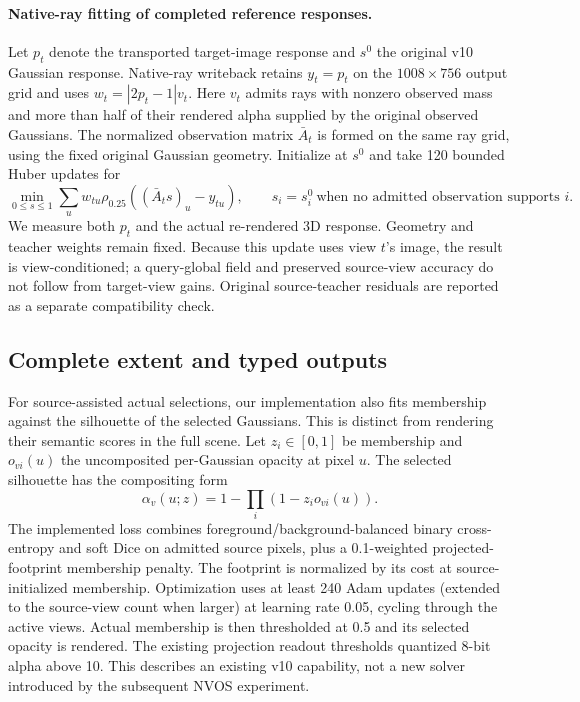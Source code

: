 \paragraph{Native-ray fitting of completed reference responses.}
Let $p_t$ denote the transported target-image response and $s^0$ the original
v10 Gaussian response. Native-ray writeback retains
$y_t=p_t$ on the
$1008\times756$ output grid and uses $w_t=|2p_t-1|v_t$. Here $v_t$ admits rays
with nonzero observed mass and more than half of their rendered alpha supplied
by the original observed Gaussians. The normalized observation matrix
$\bar A_t$ is formed on the same ray grid, using the fixed original Gaussian
geometry. Initialize at $s^0$ and take 120 bounded Huber updates for
\begin{equation}
 \min_{0\leq s\leq1}\sum_u w_{tu}\rho_{0.25}((\bar A_t s)_u-y_{tu}),
 \qquad s_i=s_i^0\ \text{when no admitted observation supports }i.
\end{equation}
We measure both $p_t$ and the actual re-rendered 3D response. Geometry and
teacher weights remain fixed. Because this update uses view $t$'s image,
the result is view-conditioned; a query-global field and preserved source-view
accuracy do not follow from target-view gains. Original source-teacher
residuals are reported as a separate compatibility check.

\subsection{Complete extent and typed outputs}
For source-assisted actual selections, our implementation also fits membership
against the silhouette of the selected Gaussians. This is distinct from rendering
their semantic scores in the full scene. Let $z_i\in[0,1]$ be membership and
$o_{vi}(u)$ the uncomposited per-Gaussian opacity at pixel $u$. The selected
silhouette has the compositing form
\begin{equation}
 \alpha_v(u;z)=1-\prod_i(1-z_i o_{vi}(u)).
\end{equation}
The implemented loss combines foreground/background-balanced binary
cross-entropy and soft Dice on admitted source pixels, plus a 0.1-weighted
projected-footprint membership penalty. The footprint is normalized by its
cost at source-initialized membership. Optimization uses at least 240 Adam
updates (extended to the source-view count when larger) at learning rate 0.05,
cycling through the active views. Actual membership is then
thresholded at 0.5 and its selected opacity is rendered. The existing projection
readout thresholds quantized 8-bit alpha above 10. This describes an existing
v10 capability, not a new solver introduced by the subsequent NVOS experiment.

